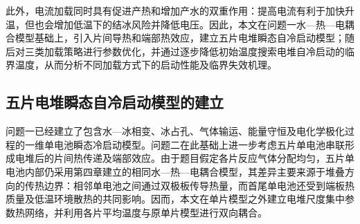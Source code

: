 \documentclass[bwprint]{gmcmthesis}
\numberwithin{figure}{section}
\begin{document}
此外，电流加载同时具有促进产热和增加产水的双重作用：提高电流有利于加快升温，但也会增加低温下的结冰风险并降低电压。因此，本文在问题一水—热—电耦合模型基础上，引入片间导热和端部热效应，建立五片电堆瞬态自冷启动模型；随后对三类加载策略进行参数优化，并通过逐步降低初始温度搜索电堆自冷启动的临界温度，从而分析不同加载方式下的启动性能及临界失效机理。
\subsection{五片电堆瞬态自冷启动模型的建立}
问题一已经建立了包含水—冰相变、冰占孔、气体输运、能量守恒及电化学极化过程的一维单电池瞬态冷启动模型。问题二在此基础上进一步考虑五片单电池串联形成电堆后的片间热传递及端部效应。由于题目假定各片反应气体分配均匀，五片单电池内部仍采用第四章建立的相同水—热—电耦合模型，其差异主要来源于堆叠方向的传热边界：相邻单电池之间通过双极板传导热量，而首尾单电池还受到端板热质量及低温环境散热的共同影响。因而，本文在单片模型之外建立电堆尺度集中参数热网络，并利用各片平均温度与原单片模型进行双向耦合。
\end{document}
